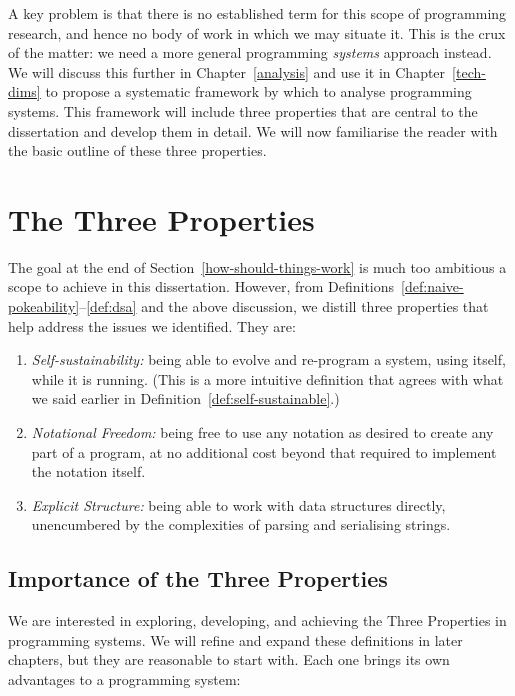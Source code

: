 \documentclass[ twoside,openright,titlepage,numbers=noenddot,headinclude,footinclude,cleardoublepage=empty,abstract=on,
                BCOR=5mm,paper=a4,fontsize=11pt
                ]{scrreprt}
\providecommand{\tightlist}{}\newenvironment{longtable}[2]{\begin{tabular}}{\end{tabular}}
\theoremstyle{definition}
\begin{document}
A key problem is that there is no established term for this scope of
programming research, and hence no body of work in which we may situate
it. This is the crux of the matter: we need a more general programming
\emph{systems} approach instead. We will discuss this further in
Chapter~\ref{analysis} and use it in Chapter~\ref{tech-dims} to propose
a systematic framework by which to analyse programming systems. This
framework will include three properties that are central to the
dissertation and develop them in detail. We will now familiarise the
reader with the basic outline of these three properties.

\hypertarget{the-three-properties}{\section{The Three Properties}\label{the-three-properties}}

The goal at the end of Section~\ref{how-should-things-work} is much too
ambitious a scope to achieve in this dissertation. However, from
Definitions~\ref{def:naive-pokeability}--\ref{def:dsa} and the above
discussion, we distill three properties that help address the issues we
identified. They are:

\begin{enumerate}
\def\labelenumi{\arabic{enumi}.}
\tightlist
\item
  \emph{Self-sustainability:} being able to evolve and re-program a
  system, using itself, while it is running. (This is a more intuitive
  definition that agrees with what we said earlier in
  Definition~\ref{def:self-sustainable}.)
\item
  \emph{Notational Freedom:} being free to use any notation as desired
  to create any part of a program, at no additional cost beyond that
  required to implement the notation itself.
\item
  \emph{Explicit Structure:} being able to work with data structures
  directly, unencumbered by the complexities of parsing and serialising
  strings.
\end{enumerate}

\hypertarget{importance-of-the-three-properties}{\subsection{Importance of the Three
Properties}\label{importance-of-the-three-properties}}

We are interested in exploring, developing, and achieving the Three
Properties in programming systems. We will refine and expand these
definitions in later chapters, but they are reasonable to start with.
Each one brings its own advantages to a programming system:
\end{document}

